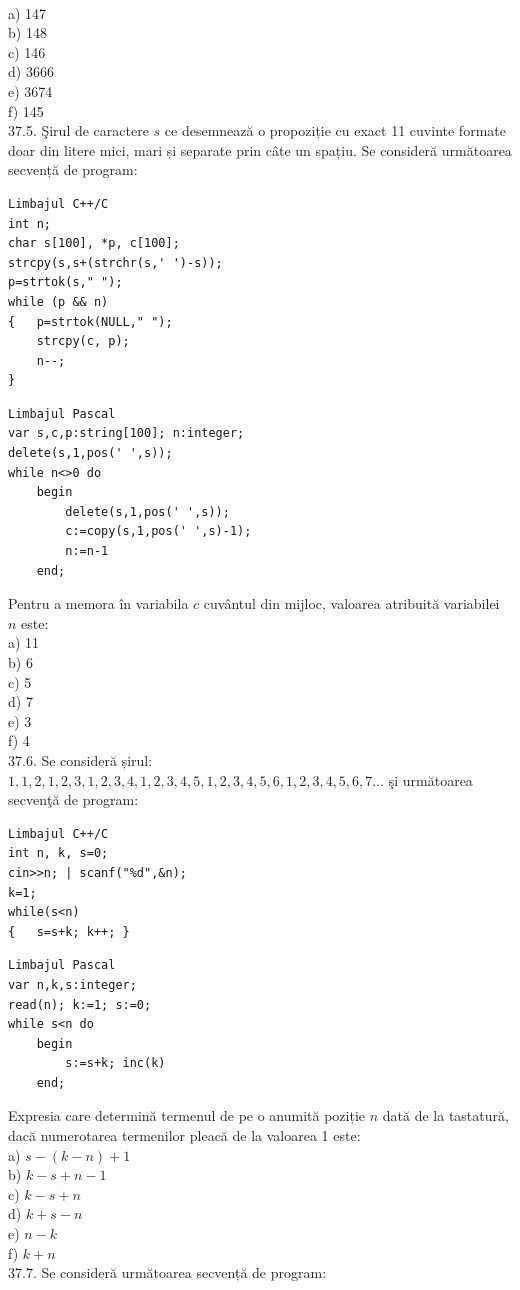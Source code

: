 \begin{itemize}
\begin{enumerate}
\\
a) 147
\\
b) 148
\\
c) 146
\\
d) 3666
\\
e) 3674
\\
f) 145
\\
37.5. Şirul de caractere $s$ ce desemnează o propoziție cu exact 11 cuvinte formate doar din litere mici, mari și separate prin câte un spațiu. Se consideră următoarea secvență de program:
\begin{verbatim}
Limbajul C++/C
int n;
char s[100], *p, c[100];
strcpy(s,s+(strchr(s,' ')-s));
p=strtok(s," ");
while (p && n)
{   p=strtok(NULL," ");
    strcpy(c, p);
    n--;
}
\end{verbatim}
\begin{verbatim}
Limbajul Pascal
var s,c,p:string[100]; n:integer;
delete(s,1,pos(' ',s));
while n<>0 do
    begin
        delete(s,1,pos(' ',s));
        c:=copy(s,1,pos(' ',s)-1);
        n:=n-1
    end;
\end{verbatim}
Pentru a memora în variabila $c$ cuvântul din mijloc, valoarea atribuită variabilei $n$ este:
\\
a) 11
\\
b) 6
\\
c) 5
\\
d) 7
\\
e) 3
\\
f) 4
\\
37.6. Se consideră șirul: $1,1,2,1,2,3,1,2,3,4,1,2,3,4,5,1,2,3,4,5,6,1,2,3,4,5,6,7 \ldots$ şi următoarea secvenţă de program:
\begin{verbatim}
Limbajul C++/C
int n, k, s=0;
cin>>n; | scanf("%d",&n);
k=1;
while(s<n)
{   s=s+k; k++; }
\end{verbatim}
\begin{verbatim}
Limbajul Pascal
var n,k,s:integer;
read(n); k:=1; s:=0;
while s<n do
    begin
        s:=s+k; inc(k)
    end;
\end{verbatim}
Expresia care determină termenul de pe o anumită poziție $n$ dată de la tastatură, dacă numerotarea termenilor pleacă de la valoarea 1 este:
\\
a) $s-(k-n)+1$
\\
b) $k-s+n-1$
\\
c) $k-s+n$
\\
d) $k+s-n$
\\
e) $n-k$
\\
f) $k+n$
\\
37.7. Se consideră următoarea secvență de program:

\end{enumerate}
\end{itemize}
